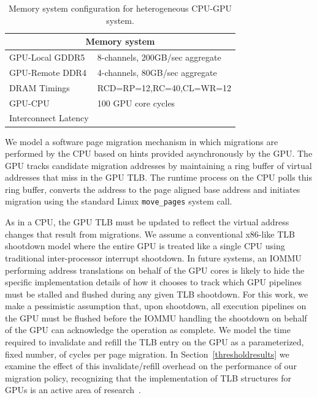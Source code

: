 \begin{table}[t]
\begin{center}
\begin{tabular}{|l|l|}
\hline
\multicolumn{2}{|c|}{Memory system}\\
\hline
GPU-Local GDDR5 & 8-channels, 200GB/sec aggregate\\
\hline
GPU-Remote DDR4& 4-channels, 80GB/sec aggregate\\
\hline
DRAM Timings & \multicolumn{1}{|l|}{RCD=RP=12,RC=40,CL=WR=12}\\
\hline
GPU-CPU &  100 GPU core cycles\\
Interconnect Latency & \\
\hline
\end{tabular}
\caption{Memory system configuration for heterogeneous CPU-GPU system.}
\label{tab:mig-methodology}
\end{center}
\end{table}

We model a software page migration mechanism in which migrations are performed
by the CPU based on hints provided asynchronously by the GPU\@.  The GPU tracks
candidate migration addresses by maintaining a ring buffer of virtual addresses
that miss in the GPU TLB.  The runtime process on the CPU polls this ring
buffer, converts the address to the page aligned base address and initiates
migration using the standard Linux {\tt move\_pages} system call.

As in a CPU, the GPU TLB must be updated to reflect the virtual address changes
that result from migrations.  We assume a conventional x86-like TLB shootdown
model where the entire GPU is treated like a single CPU using traditional
inter-processor interrupt shootdown.  In future systems, an IOMMU performing
address translations on behalf of the GPU cores is likely to hide the specific
implementation details of how it chooses to track which GPU pipelines must be
stalled and flushed during any given TLB shootdown.  For this work, we make a
pessimistic assumption that, upon shootdown, all execution pipelines on the GPU
must be flushed before the IOMMU handling the shootdown on behalf of the GPU can
acknowledge the operation as complete. We model the time required to invalidate
and refill the TLB entry on the GPU as a parameterized, fixed number, of cycles
per page migration. In Section~\ref{thresholdresults} we examine the effect of
this invalidate/refill overhead on the performance of our migration policy,
recognizing that the implementation of TLB structures for GPUs is an active area
of research~\cite{Pichai2014,Power2014}.

